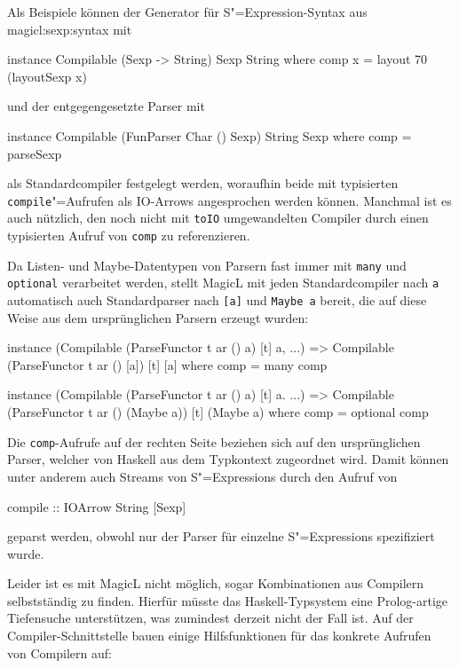 \documentclass[12pt, a4paper, bibgerm]{scrbook}
\newenvironment{DIFnomarkup}{}{}
\newcommand\icode[1]{\lstinline?#1?}
\newcommand\sref{}
\newcommand{\sexp}{S"=Expression}
\newcommand{\sexps}{S"=Expressions}
\begin{document}
Als Beispiele können der Generator für \sexp{}-Syntax aus
\sref{magicl:sexp:syntax} mit
\begin{DIFnomarkup}\begin{code}
instance Compilable (Sexp -> String) Sexp String where
  comp x = layout 70 (layoutSexp x)
\end{code}\end{DIFnomarkup}
und der entgegengesetzte Parser mit
\begin{DIFnomarkup}\begin{code}
instance Compilable (FunParser Char () Sexp) String Sexp where
  comp = parseSexp
\end{code}\end{DIFnomarkup}
als Standardcompiler festgelegt werden, woraufhin beide mit typisierten
\icode{compile}"=Aufrufen als IO-Arrows angesprochen werden
können. Manchmal ist es auch nützlich, den noch nicht mit \icode{toIO}
umgewandelten Compiler durch einen typisierten Aufruf von \icode{comp}
zu referenzieren.

Da Listen- und Maybe-Datentypen von Parsern fast immer mit \icode{many}
und \icode{optional} verarbeitet werden, stellt MagicL mit jeden
Standardcompiler nach \icode{a} automatisch auch Standardparser nach \icode{[a]} und
\icode{Maybe a} bereit, die auf diese Weise aus dem ursprünglichen
Parsern erzeugt wurden:
\begin{DIFnomarkup}\begin{code}
instance (Compilable (ParseFunctor t ar () a) [t] a, ...) =>
  Compilable (ParseFunctor t ar () [a]) [t] [a] where
    comp = many comp

instance (Compilable (ParseFunctor t ar () a) [t] a. ...) =>
  Compilable (ParseFunctor t ar () (Maybe a)) [t] (Maybe a) where
    comp = optional comp
\end{code}\end{DIFnomarkup}
Die \icode{comp}-Aufrufe auf der rechten Seite beziehen sich auf den
ursprünglichen Parser, welcher von Haskell aus dem Typkontext zugeordnet
wird. Damit können unter anderem auch Streams von \sexps{} durch den Aufruf von
\begin{code}
compile :: IOArrow String [Sexp]
\end{code}
geparst werden, obwohl nur der Parser für einzelne \sexps{}
spezifiziert wurde.

Leider ist es mit MagicL nicht möglich, sogar Kombinationen aus
Compilern selbstständig zu finden. Hierfür müsste das Haskell-Typsystem
eine Prolog-artige Tiefensuche unterstützen, was zumindest derzeit nicht
der Fall ist. Auf der Compiler-Schnittstelle bauen einige
Hilfsfunktionen für das konkrete Aufrufen von Compilern auf:
\end{document}
